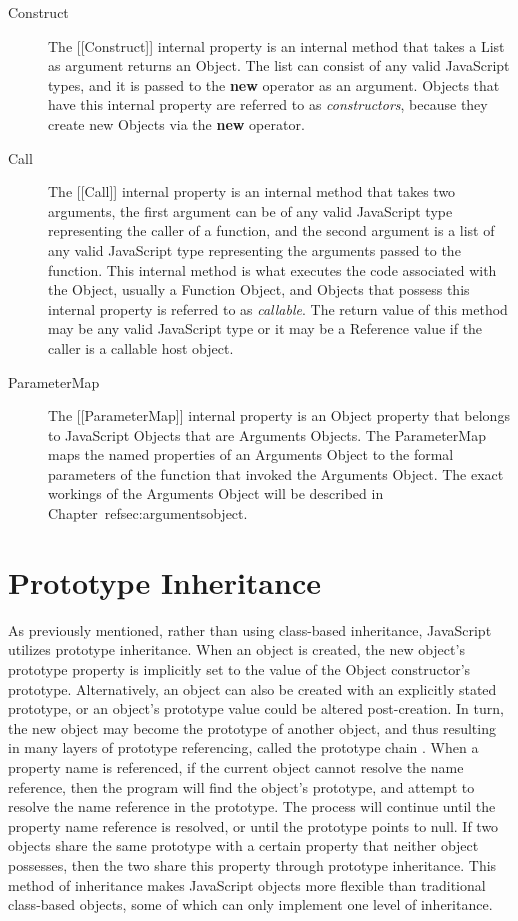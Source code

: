 \documentclass[a4paper,11pt,twoside]{report}
\begin{document}
\begin{description}
\item[Construct]
The [[Construct]] internal property is an internal method that takes a List as argument returns an Object. The list can consist of any valid JavaScript types, and it is passed to the \textbf{new} operator as an argument. Objects that have this internal property are referred to as \textit{constructors}, because they create new Objects via the \textbf{new} operator.

\item[Call]
The [[Call]] internal property is an internal method that takes two arguments, the first argument can be of any valid JavaScript type representing the caller of a function, and the second argument is a list of any valid JavaScript type representing the arguments passed to the function. This internal method is what executes the code associated with the Object, usually a Function Object, and Objects that possess this internal property is referred to as \textit{callable}. The return value of this method may be any valid JavaScript type or it may be a Reference value if the caller is a callable host object.

\item[ParameterMap]
The [[ParameterMap]] internal property is an Object property that belongs to JavaScript Objects that are Arguments Objects. The ParameterMap maps the named properties of an Arguments Object to the formal parameters of the function that invoked the Arguments Object. The exact workings of the Arguments Object will be described in Chapter~ref{sec:argumentsobject}.
\end{description}

\section{Prototype Inheritance}
As previously mentioned, rather than using class-based inheritance, JavaScript utilizes prototype inheritance. When an object is created, the new object's prototype property is implicitly set to the value of the Object constructor's prototype. Alternatively, an object can also be created with an explicitly stated prototype, or an object's prototype value could be altered post-creation. In turn, the new object may become the prototype of another object, and thus resulting in many layers of prototype referencing, called the prototype chain \cite{EcmaScript}. When a property name is referenced, if the current object cannot resolve the name reference, then the program will find the object's prototype, and attempt to resolve the name reference in the prototype. The process will continue until the property name reference is resolved, or until the prototype points to null. If two objects share the same prototype with a certain property that neither object possesses, then the two share this property through prototype inheritance. This method of inheritance makes JavaScript objects more flexible than traditional class-based objects, some of which can only implement one level of inheritance.
\end{document}
